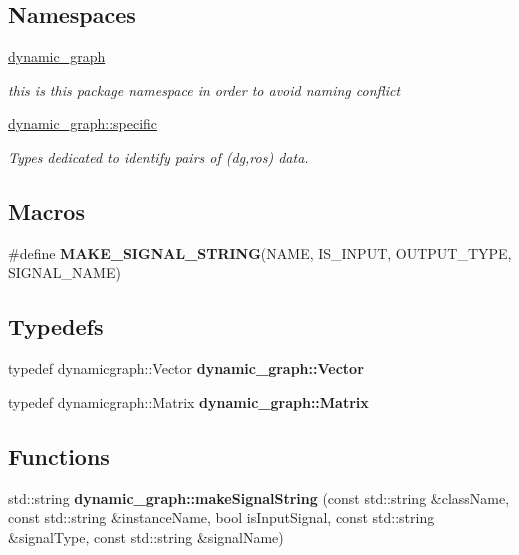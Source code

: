 \subsection*{Namespaces}
\begin{DoxyCompactItemize}
\item 
 \hyperlink{namespacedynamic__graph}{dynamic\+\_\+graph}
\begin{DoxyCompactList}\small\item\em this is this package namespace in order to avoid naming conflict \end{DoxyCompactList}\item 
 \hyperlink{namespacedynamic__graph_1_1specific}{dynamic\+\_\+graph\+::specific}
\begin{DoxyCompactList}\small\item\em Types dedicated to identify pairs of (dg,ros) data. \end{DoxyCompactList}\end{DoxyCompactItemize}
\subsection*{Macros}
\begin{DoxyCompactItemize}
\item 
\#define {\bfseries M\+A\+K\+E\+\_\+\+S\+I\+G\+N\+A\+L\+\_\+\+S\+T\+R\+I\+NG}(N\+A\+ME,  I\+S\+\_\+\+I\+N\+P\+UT,  O\+U\+T\+P\+U\+T\+\_\+\+T\+Y\+PE,  S\+I\+G\+N\+A\+L\+\_\+\+N\+A\+ME)
\end{DoxyCompactItemize}
\subsection*{Typedefs}
\begin{DoxyCompactItemize}
\item 
\mbox{\label{namespacedynamic__graph_a2df237966b015fea47c58c7778cc9a73}} 
typedef dynamicgraph\+::\+Vector {\bfseries dynamic\+\_\+graph\+::\+Vector}
\item 
\mbox{\label{namespacedynamic__graph_a58a622fc51830acb132d3a3f18115374}} 
typedef dynamicgraph\+::\+Matrix {\bfseries dynamic\+\_\+graph\+::\+Matrix}
\end{DoxyCompactItemize}
\subsection*{Functions}
\begin{DoxyCompactItemize}
\item 
\mbox{\label{namespacedynamic__graph_a5e89dc0ac6a2d2c1368c7d4617585f6b}} 
std\+::string {\bfseries dynamic\+\_\+graph\+::make\+Signal\+String} (const std\+::string \&class\+Name, const std\+::string \&instance\+Name, bool is\+Input\+Signal, const std\+::string \&signal\+Type, const std\+::string \&signal\+Name)
\end{DoxyCompactItemize}


